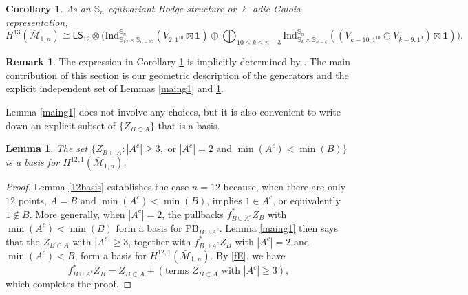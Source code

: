 \documentclass[12pt]{amsart}
\newtheorem{lem}[thm]{Lemma}
\newtheorem{cor}[thm]{Corollary}
\theoremstyle{definition}
\newtheorem{rem}[thm]{Remark}
\numberwithin{equation}{section}
\newcommand{\M}{\mathcal{M}}
\newcommand{\Mb}{\overline{\M}}
\newcommand{\pb}{\mathrm{PB}}
\theoremstyle{definition} %
\theoremstyle{remark}
\begin{document}
\begin{cor}
\label{gid}
As an $\mathbb{S}_n$-equivariant  Hodge structure or $\ell$-adic Galois representation,
\[H^{13}(\Mb_{1,n}) \cong \mathsf{L}\mathsf{S}_{12} \otimes \Big(\mathrm{Ind}^{\mathbb{S}_n}_{\mathbb{S}_{12} \times \mathbb{S}_{n-12}}(V_{2,1^{10}} \boxtimes \mathbf{1}) \oplus \bigoplus_{10 \leq k \leq n-3} \mathrm{Ind}^{\mathbb{S}_n}_{\mathbb{S}_k \times \mathbb{S}_{n-k}}((V_{k-10,1^{10}} \oplus V_{k-9,1^{9}})
\boxtimes \mathbf{1}) \Big). \]
\end{cor}

\begin{rem}
The expression in Corollary \ref{gid} is implicitly
determined by \cite[Theorem 2.6]{Getzler}. The main contribution of this section is our geometric description of the generators and the explicit independent set of Lemmas \ref{maing1} and \ref{altg1}.
\end{rem}

Lemma \ref{maing1} does not involve any choices, but it is also convenient to write down an explicit subset of $\{Z_{B \subset A}\}$ that is a basis.

\begin{lem}\label{altg1}
The set $\{Z_{B \subset A}: |A^c| \geq 3, \mbox{ or } |A^c| = 2  \mbox{ and } \min(A^c) < \min(B)\}$ is a basis for $H^{12,1}(\Mb_{1,n})$. 
\end{lem}
\begin{proof}
Lemma \ref{12basis} establishes the case $n = 12$ because, when there are only $12$ points, $A = B$ and $\min(A^c) < \min(B)$, implies $1 \in A^c$, or equivalently $1 \notin B$.
More generally, when $|A^c| = 2$, the pullbacks $f_{B \cup A^c}^*Z_{B}$ with $\min(A^c) < \min(B)$ form a basis for $\pb_{B \cup A^c}$. Lemma \ref{maing1} then says that the $Z_{B \subset A}$ with $|A^c| \geq 3$, together with $f_{B \cup A^c}^*Z_{B}$ with $|A^c| = 2$ and $\min(A^c) < B$, form a basis for $H^{12,1}(\Mb_{1,n})$. By \eqref{fE}, we have \[f_{B \cup A^c}^*Z_{B} = Z_{B \subset A} + (\text{terms $Z_{B \subset A}$ with $|A^c| \geq 3$}),\]
which completes the proof.
\end{proof}
\end{document}
